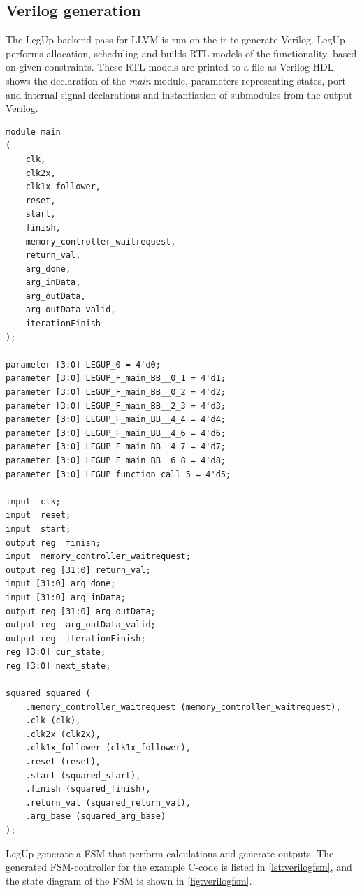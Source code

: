 \subsection{Verilog generation}
The LegUp backend pass for LLVM is run on the \gls{ir} to generate Verilog. LegUp performs allocation, scheduling and builds RTL models of the functionality, based on given constraints. These RTL-models are printed to a file as Verilog HDL.  shows the declaration of the \textit{main}-module, parameters representing states, port- and internal signal-declarations and instantiation of submodules from the output Verilog.
\clearpage
\lstset{language=Verilog, style=VerilogStyle}
\begin{lstlisting}[caption={Verilog module, port, signal and parameter declaration, and sub-module instantiation},label=lst:verilogmodule1]
module main
(
	clk,
	clk2x,
	clk1x_follower,
	reset,
	start,
	finish,
	memory_controller_waitrequest,
	return_val,
	arg_done,
	arg_inData,
	arg_outData,
	arg_outData_valid,
	iterationFinish
);

parameter [3:0] LEGUP_0 = 4'd0;
parameter [3:0] LEGUP_F_main_BB__0_1 = 4'd1;
parameter [3:0] LEGUP_F_main_BB__0_2 = 4'd2;
parameter [3:0] LEGUP_F_main_BB__2_3 = 4'd3;
parameter [3:0] LEGUP_F_main_BB__4_4 = 4'd4;
parameter [3:0] LEGUP_F_main_BB__4_6 = 4'd6;
parameter [3:0] LEGUP_F_main_BB__4_7 = 4'd7;
parameter [3:0] LEGUP_F_main_BB__6_8 = 4'd8;
parameter [3:0] LEGUP_function_call_5 = 4'd5;

input  clk;
input  reset;
input  start;
output reg  finish;
input  memory_controller_waitrequest;
output reg [31:0] return_val;
input [31:0] arg_done;
input [31:0] arg_inData;
output reg [31:0] arg_outData;
output reg  arg_outData_valid;
output reg  iterationFinish;
reg [3:0] cur_state;
reg [3:0] next_state;

squared squared (
	.memory_controller_waitrequest (memory_controller_waitrequest),
	.clk (clk),
	.clk2x (clk2x),
	.clk1x_follower (clk1x_follower),
	.reset (reset),
	.start (squared_start),
	.finish (squared_finish),
	.return_val (squared_return_val),
	.arg_base (squared_arg_base)
);
\end{lstlisting}
LegUp generate a FSM that perform calculations and generate outputs. The generated FSM-controller for the example C-code is listed in \cref{lst:verilogfsm}, and the state diagram of the FSM is shown in \cref{fig:verilogfsm}.
